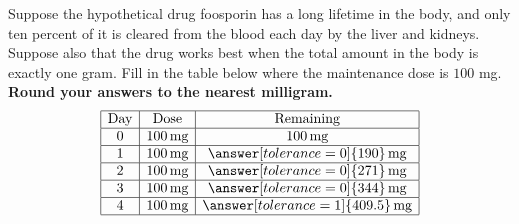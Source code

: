 \documentclass{ximera}
\begin{document}
\newpage
\begin{question}
  Suppose the hypothetical drug foosporin has a long lifetime in the
  body, and only ten percent of it is cleared from the blood each day
  by the liver and kidneys. Suppose also that the drug works best when
  the total amount in the body is exactly one gram. Fill in the table
  below where the maintenance dose is $100$ mg. \textbf{Round your answers to the
  nearest milligram.}
  \[
  \begin{array}{|c|c|c|}
    \hline
    \text{Day} & \text{Dose} & \text{Remaining} \\ \hline
    0  & 100\,\text{mg} & 100\,\text{mg} \\ \hline
    1  & 100\,\text{mg} & \answer[tolerance=0]{190}\,\text{mg}\\ \hline
    2  & 100\,\text{mg} & \answer[tolerance=0]{271}\,\text{mg}\\ \hline
    3  & 100\,\text{mg} & \answer[tolerance=0]{344}\,\text{mg}\\ \hline
    4  & 100\,\text{mg} & \answer[tolerance=1]{409.5}\,\text{mg}\\ \hline
  \end{array}
  \]
\end{question}

\end{document}

